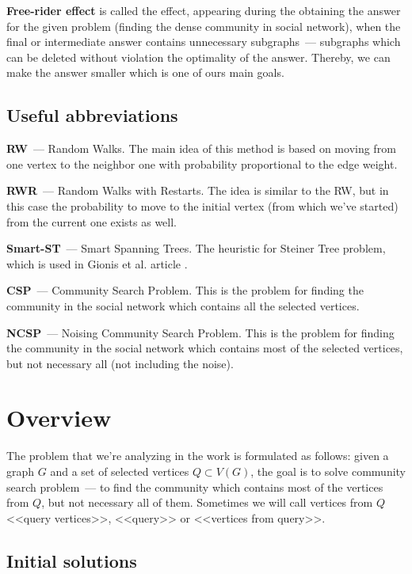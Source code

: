 \textbf{Free-rider effect} is called the effect, appearing during the obtaining the answer for the given problem (finding the dense community in social network), when the final or intermediate answer contains unnecessary subgraphs~--- subgraphs which can be deleted without violation the optimality of the answer. Thereby, we can make the answer smaller which is one of ours main goals.

\subsection{Useful abbreviations}

\textbf{RW}~--- Random Walks. The main idea of this method is based on moving from one vertex to the neighbor one with probability proportional to the edge weight.

\textbf{RWR}~--- Random Walks with Restarts. The idea is similar to the RW, but in this case the probability to move to the initial vertex (from which we've started) from the current one exists as well.

\textbf{Smart-ST}~--- Smart Spanning Trees. The heuristic for Steiner Tree problem, which is used in Gionis et al. article \cite{Gionis15}.

\textbf{CSP}~--- Community Search Problem. This is the problem for finding the community in the social network which contains all the selected vertices.

\textbf{NCSP}~--- Noising Community Search Problem. This is the problem for finding the community in the social network which contains most of the selected vertices, but not necessary all (not including the noise).

\section{Overview}

The problem that we're analyzing in the work is formulated as follows: given a graph $G$ and a set of selected vertices $Q \subset V(G)$, the goal is to solve community search problem~--- to find the community which contains most of the vertices from $Q$, but not necessary all of them. Sometimes we will call vertices from $Q$ <<query vertices>>, <<query>> or <<vertices from query>>.

\subsection{Initial solutions}

